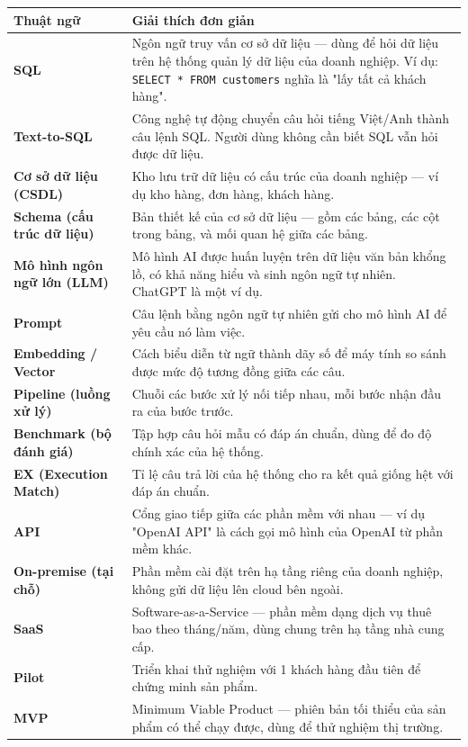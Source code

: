\documentclass[11pt,a4paper]{article}
\begin{document}
\begin{longtable}{|L{3.2cm}|L{12cm}|}
\hline
{}\textbf{Thuật ngữ} & \textbf{Giải thích đơn giản} \\
\hline\endhead

\textbf{SQL} & Ngôn ngữ truy vấn cơ sở dữ liệu --- dùng để hỏi dữ liệu trên hệ thống quản lý dữ liệu của doanh nghiệp. Ví dụ: \texttt{SELECT * FROM customers} nghĩa là "lấy tất cả khách hàng". \\ \hline
\textbf{Text-to-SQL} & Công nghệ tự động chuyển câu hỏi tiếng Việt/Anh thành câu lệnh SQL. Người dùng không cần biết SQL vẫn hỏi được dữ liệu. \\ \hline
\textbf{Cơ sở dữ liệu (CSDL)} & Kho lưu trữ dữ liệu có cấu trúc của doanh nghiệp --- ví dụ kho hàng, đơn hàng, khách hàng. \\ \hline
\textbf{Schema (cấu trúc dữ liệu)} & Bản thiết kế của cơ sở dữ liệu --- gồm các bảng, các cột trong bảng, và mối quan hệ giữa các bảng. \\ \hline
\textbf{Mô hình ngôn ngữ lớn (LLM)} & Mô hình AI được huấn luyện trên dữ liệu văn bản khổng lồ, có khả năng hiểu và sinh ngôn ngữ tự nhiên. ChatGPT là một ví dụ. \\ \hline
\textbf{Prompt} & Câu lệnh bằng ngôn ngữ tự nhiên gửi cho mô hình AI để yêu cầu nó làm việc. \\ \hline
\textbf{Embedding / Vector} & Cách biểu diễn từ ngữ thành dãy số để máy tính so sánh được mức độ tương đồng giữa các câu. \\ \hline
\textbf{Pipeline (luồng xử lý)} & Chuỗi các bước xử lý nối tiếp nhau, mỗi bước nhận đầu ra của bước trước. \\ \hline
\textbf{Benchmark (bộ đánh giá)} & Tập hợp câu hỏi mẫu có đáp án chuẩn, dùng để đo độ chính xác của hệ thống. \\ \hline
\textbf{EX (Execution Match)} & Tỉ lệ câu trả lời của hệ thống cho ra kết quả giống hệt với đáp án chuẩn. \\ \hline
\textbf{API} & Cổng giao tiếp giữa các phần mềm với nhau --- ví dụ "OpenAI API" là cách gọi mô hình của OpenAI từ phần mềm khác. \\ \hline
\textbf{On-premise (tại chỗ)} & Phần mềm cài đặt trên hạ tầng riêng của doanh nghiệp, không gửi dữ liệu lên cloud bên ngoài. \\ \hline
\textbf{SaaS} & Software-as-a-Service --- phần mềm dạng dịch vụ thuê bao theo tháng/năm, dùng chung trên hạ tầng nhà cung cấp. \\ \hline
\textbf{Pilot} & Triển khai thử nghiệm với 1 khách hàng đầu tiên để chứng minh sản phẩm. \\ \hline
\textbf{MVP} & Minimum Viable Product --- phiên bản tối thiểu của sản phẩm có thể chạy được, dùng để thử nghiệm thị trường. \\ \hline

\end{longtable}
\end{document}
